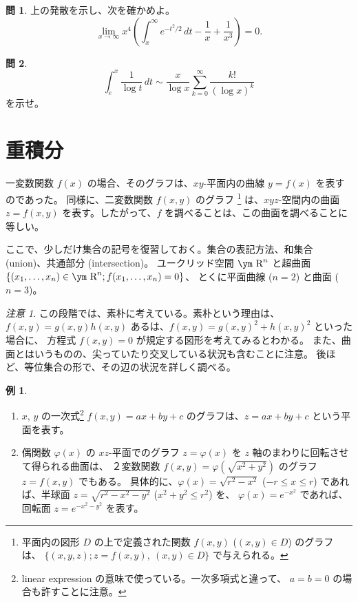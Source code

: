 \documentclass[a4paper]{jsarticle}
\theoremstyle{definition}
\newtheorem{Example}[Theorem]{例}
\newtheorem{Exercise}{問}%
\theoremstyle{remark}
\newtheorem{Remark}{注意}
\newcommand{\R}{\text{\ym R}}
\begin{document}
\begin{Exercise} 上の発散を示し、次を確かめよ。
  \[
    \lim_{x \to \infty} x^4 \left(  \int_x^\infty e^{-t^2/2}\, dt - \frac{1}{x} + \frac{1}{x^3}\right) = 0.
    \]
\end{Exercise}

\begin{Exercise}
  \[
    \int_e^x \frac{1}{\log t}\, dt \sim \frac{x}{\log x} \sum_{k=0}^\infty \frac{k!}{(\log x)^k}
  \]
  を示せ。
\end{Exercise}


\section{重積分}
一変数関数 $f(x)$ の場合、そのグラフは、$xy$-平面内の曲線 $y = f(x)$ を表すのであった。
同様に、二変数関数 $f(x,y)$ のグラフ
\footnote{平面内の図形 $D$ の上で定義された関数 
$f(x,y)$ ($(x,y) \in D$) のグラフは、
$\{ (x,y,z); z = f(x,y),\ (x,y) \in D\}$
で与えられる。}
は、$xyz$-空間内の曲面 $z = f(x,y)$ を表す。したがって、$f$ を調べることは、この曲面を調べることに
等しい。

ここで、少しだけ集合の記号を復習しておく。集合の表記方法、和集合 (union)、共通部分 (intersection)。
ユークリッド空間 $\R^n$ と超曲面 $\{ (x_1,\dots,x_n) \in \R^n; f(x_1,\dots,x_n) = 0 \}$、
とくに平面曲線 ($n=2$) と曲面 ($n=3$)。

\begin{Remark}{\small
この段階では、素朴に考えている。素朴という理由は、
$f(x,y) = g(x,y)h(x,y)$ あるは、$f(x,y) = g(x,y)^2 + h(x,y)^2$ といった場合に、
方程式 $f(x,y) = 0$ が規定する図形を考えてみるとわかる。
また、曲面とはいうものの、尖っていたり交叉している状況も含むことに注意。
後ほど、等位集合の形で、その辺の状況を詳しく調べる。}  
\end{Remark}

\begin{Example}~ 
  \begin{enumerate}
  \item 
$x$, $y$ の一次式\footnote{linear expression の意味で使っている。一次多項式と違って、
$a=b=0$ の場合も許すことに注意。} $f(x,y) = ax+by + c$ のグラフは、$z= ax+by+c$ という平面を表す。
\item 
偶関数 $\varphi(x)$ の $xz$-平面でのグラフ $z=\varphi(x)$ 
を $z$ 軸のまわりに回転させて得られる曲面は、
２変数関数 $f(x,y) = \varphi(\sqrt{x^2+y^2})$ のグラフ $z=f(x,y)$ でもある。
具体的に、$\varphi(x) = \sqrt{r^2 - x^2}$ ($-r \leq x \leq r$) であれば、半球面 
$z = \sqrt{r^2 - x^2 - y^2}$ ($x^2+y^2 \leq r^2$) を、
$\varphi(x) = e^{-x^2}$ であれば、回転面 $z = e^{-x^2-y^2}$ を表す。
  \end{enumerate}
\end{Example}
\end{document}
